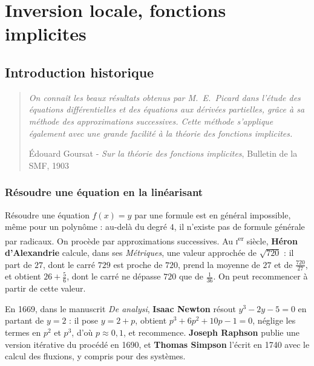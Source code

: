 \documentclass[a4paper,twoside]{report}
\begin{document}
\setcounter{chapter}{2}

\chapter[Inversion locale, fonctions implicites]{Inversion locale, fonctions implicites}

\section{Introduction historique}

\begin{quote}
\emph{On connaît les beaux résultats obtenus par M.~E.~Picard dans l'étude des équations différentielles et des équations aux dérivées partielles, grâce à sa méthode des approximations successives. Cette méthode s'applique également avec une grande facilité à la théorie des fonctions implicites.}
\begin{flushright}Édouard Goursat - \emph{Sur la théorie des fonctions implicites}, Bulletin de la SMF, 1903\end{flushright}
\end{quote}

\subsection{Résoudre une équation en la linéarisant}

Résoudre une équation $f(x) = y$ par une formule est en général impossible, même pour un polynôme : au-delà du degré $4$, il n'existe pas de formule générale par radicaux. On procède par approximations successives. Au \textsc{i}\textsuperscript{er} siècle, \textbf{Héron d'Alexandrie} calcule, dans ses \emph{Métriques}, une valeur approchée de $\sqrt{720}$ : il part de $27$, dont le carré $729$ est proche de $720$, prend la moyenne de $27$ et de $\frac{720}{27}$, et obtient $26 + \frac{5}{6}$, dont le carré ne dépasse $720$ que de $\frac{1}{36}$. On peut recommencer à partir de cette valeur.

En 1669, dans le manuscrit \emph{De analysi}, \textbf{Isaac Newton} résout $y^{3} - 2y - 5 = 0$ en partant de $y = 2$ : il pose $y = 2 + p$, obtient $p^{3} + 6p^{2} + 10p - 1 = 0$, néglige les termes en $p^{2}$ et $p^{3}$, d'où $p \approx 0{,}1$, et recommence. \textbf{Joseph Raphson} publie une version itérative du procédé en 1690, et \textbf{Thomas Simpson} l'écrit en 1740 avec le calcul des fluxions, y compris pour des systèmes.
\end{document}
